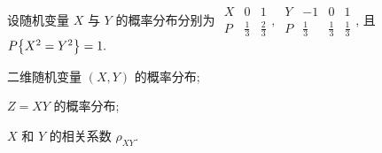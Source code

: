 \begin{example}[2011 数一]
    设随机变量 $X$ 与 $Y$ 的概率分布分别为 $\begin{array}{c|cc}
            X & 0           & 1           \\\hline
            P & \frac{1}{3} & \frac{2}{3}
        \end{array},~\begin{array}{c|ccc}
            Y & -1          & 0           & 1           \\\hline
            P & \frac{1}{3} & \frac{1}{3} & \frac{1}{3}
        \end{array}$, 且 $P\qty{X^2=Y^2}=1.$\newline
    \begin{enumerate*}[label=(\arabic{*})]
        \item 二维随机变量 $(X,Y)$ 的概率分布;
        \item $Z=XY$ 的概率分布;
        \item $X$ 和 $Y$ 的相关系数 $\rho_{XY}$.
    \end{enumerate*}
\end{example}
